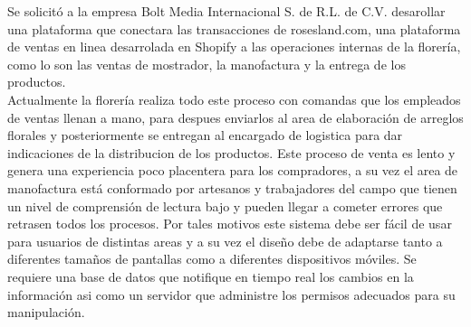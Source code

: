 Se solicitó a la empresa Bolt Media Internacional S. de R.L. de C.V.
desarollar una plataforma que conectara las transacciones de rosesland.com,
una plataforma de ventas en linea desarrolada en Shopify a las operaciones internas de la florería,
como lo son las ventas de mostrador, la manofactura y la entrega de los productos. \\[0.8cm]
Actualmente la florería realiza todo este proceso con comandas que los empleados de ventas llenan a mano, para despues
enviarlos al area de elaboración de arreglos florales y posteriormente se entregan al encargado de logistica para
dar indicaciones de la distribucion de los productos. Este proceso de venta es lento y genera una experiencia poco placentera
para los compradores, a su vez el area de manofactura está conformado por artesanos y trabajadores del campo que
tienen un nivel de comprensión de lectura bajo y pueden llegar a cometer errores que retrasen todos los procesos.
Por tales motivos este sistema debe ser fácil de usar para usuarios de distintas areas y a su vez 
el diseño debe de adaptarse tanto a diferentes tamaños de pantallas como a diferentes dispositivos móviles.
Se requiere una base de datos que notifique en tiempo real los cambios
en la información asi como un servidor que administre los permisos adecuados para su manipulación.